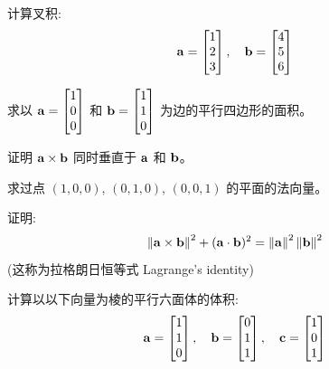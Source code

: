 \begin{exercise}
计算叉积:
\[
\mathbf{a} = \begin{bmatrix} 1 \\ 2 \\ 3 \end{bmatrix}, \quad \mathbf{b} = \begin{bmatrix} 4 \\ 5 \\ 6 \end{bmatrix}
\]
\end{exercise}

\begin{exercise}
求以 $\mathbf{a} = \begin{bmatrix} 1 \\ 0 \\ 0 \end{bmatrix}$ 和 $\mathbf{b} = \begin{bmatrix} 1 \\ 1 \\ 0 \end{bmatrix}$ 为边的平行四边形的面积。
\end{exercise}

\begin{exercise}
证明 $\mathbf{a} \times \mathbf{b}$ 同时垂直于 $\mathbf{a}$ 和 $\mathbf{b}$。
\end{exercise}

\begin{exercise}
求过点 $(1,0,0)$, $(0,1,0)$, $(0,0,1)$ 的平面的法向量。
\end{exercise}

\begin{exercise}[挑战]
证明:
\[
\left\| \mathbf{a} \times \mathbf{b} \right\|^2 + (\mathbf{a} \cdot \mathbf{b})^2 = \left\| \mathbf{a} \right\|^2 \left\| \mathbf{b} \right\|^2
\]
(这称为拉格朗日恒等式 Lagrange's identity)
\end{exercise}

\begin{problem}
计算以以下向量为棱的平行六面体的体积:
\[
\mathbf{a} = \begin{bmatrix} 1 \\ 1 \\ 0 \end{bmatrix}, \quad \mathbf{b} = \begin{bmatrix} 0 \\ 1 \\ 1 \end{bmatrix}, \quad \mathbf{c} = \begin{bmatrix} 1 \\ 0 \\ 1 \end{bmatrix}
\]
\end{problem}
